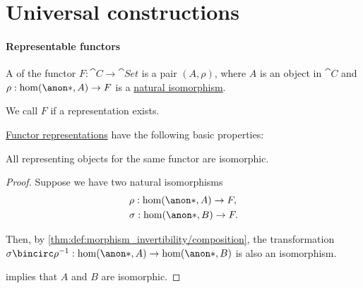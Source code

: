 \section{Universal constructions}\label{sec:universal_constructions}

\paragraph{Representable functors}

\begin{definition}\label{def:functor_representation}
  A  of the functor \( F: \cat{C} \to \cat{Set} \) is a pair \( (A, \rho) \), where \( A \) is an object in \( \cat{C} \) and \( \rho: \hom(\anon*, A) \to F \) is a \hyperref[def:natural_isomorphism]{natural isomorphism}.

  We call \( F \)  if a representation exists.
\end{definition}

\begin{proposition}\label{thm:def:functor_representation}
  \hyperref[def:functor_representation]{Functor representations} have the following basic properties:
  \begin{thmenum}
     All representing objects for the same functor are isomorphic.
  \end{thmenum}
\end{proposition}
\begin{proof}
   Suppose we have two natural isomorphisms
  \begin{align*}
    &\rho: \hom(\anon*, A) \to F, \\
    &\sigma: \hom(\anon*, B) \to F.
  \end{align*}

  Then, by \cref{thm:def:morphism_invertibility/composition}, the transformation \( \sigma \bincirc \rho^{-1}: \hom(\anon*, A) \to \hom(\anon*, B) \) is also an isomorphism.

   implies that \( A \) and \( B \) are isomorphic.
\end{proof}
